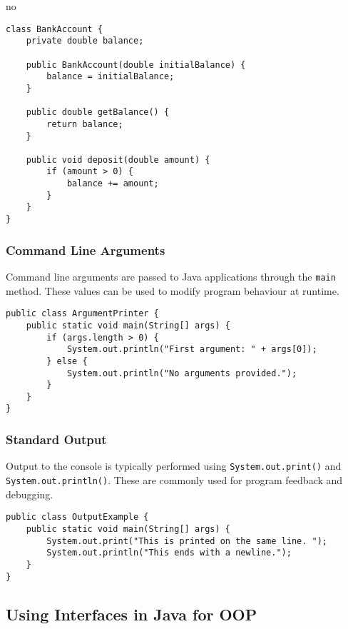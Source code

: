 no\documentclass{article}
\newcommand{\codecmd}[1]{\textcolor[rgb]{0,0.5,0}{\texttt{#1}}}
\begin{document}
\begin{verbatim}
class BankAccount {
    private double balance;

    public BankAccount(double initialBalance) {
        balance = initialBalance;
    }

    public double getBalance() {
        return balance;
    }

    public void deposit(double amount) {
        if (amount > 0) {
            balance += amount;
        }
    }
}
\end{verbatim}

\subsubsection{Command Line Arguments}

Command line arguments are passed to Java applications through the \codecmd{main} method. These values can be used to modify program behaviour at runtime.

\begin{verbatim}
public class ArgumentPrinter {
    public static void main(String[] args) {
        if (args.length > 0) {
            System.out.println("First argument: " + args[0]);
        } else {
            System.out.println("No arguments provided.");
        }
    }
}
\end{verbatim}

\subsubsection{Standard Output}

Output to the console is typically performed using \codecmd{System.out.print()} and \codecmd{System.out.println()}. These are commonly used for program feedback and debugging.

\begin{verbatim}
public class OutputExample {
    public static void main(String[] args) {
        System.out.print("This is printed on the same line. ");
        System.out.println("This ends with a newline.");
    }
}
\end{verbatim}


\subsection{Using Interfaces in Java for OOP}
\label{subsec:interfaces}
\end{document}
